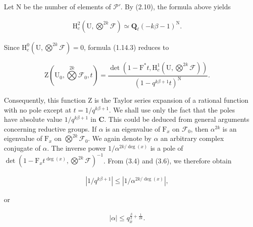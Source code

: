 \documentclass[10pt,leqno]{article}
\begin{document}
\noindent Let \(\mathrm{N}\) be the number of elements of \(\mathcal{P} '\). By (2.10), the formula above yields\par

\begin{equation*}\begin{gathered}\mathrm{H}_{c}^{2}(\mathrm{U},\bigotimes\limits^{2k}\mathcal{F} ) \simeq  \mathbf{Q}_{\ell }(- k\beta - 1)^{\mathrm{N}}.\end{gathered}\end{equation*}

\noindent Since \(\mathrm{H}_{c}^{0}(\mathrm{U},\bigotimes\limits^{2k}\mathcal{F} )=0\), formula (1.14.3) reduces to\par

\[\mathrm{Z}(\mathrm{U}_{0},\bigotimes\limits^{2k}\mathcal{F} _{0},t)=\frac{\operatorname{det}(1- \mathrm{F}^{*}t,\mathrm{H}_{c}^{1}(\mathrm{U},\bigotimes\limits^{2k}\mathcal{F} ))}{(1- q^{k\beta +1}t)^{\mathrm{N}}}.\]

\noindent Consequently, this function \(\mathrm{Z}\) is the Taylor series expansion of a rational function with no pole except at \(t=1/q^{k\beta +1}\). We shall use only the fact that the poles have absolute value \(1/q^{k\beta +1}\) in \(\mathbf{C}\). This could be deduced from general arguments concerning reductive groups. If \(\alpha \) is an eigenvalue of \(\mathrm{F}_{x}\) on \(\mathcal{F} _{0}\), then \(\alpha ^{2k}\) is an eigenvalue of \(\mathrm{F}_{x}\) on \(\bigotimes\limits^{2k}\mathcal{F} _{0}\). We again denote by \(\alpha \) an arbitrary complex conjugate of \(\alpha \). The inverse power \(1/\alpha ^{2k/\operatorname{deg}(x)}\) is a pole of \(\operatorname{det}(1- \mathrm{F}_{x} t^{\operatorname{deg}(x)},\bigotimes\limits^{2k}\mathcal{F} )^{- 1}\). From (3.4) and (3.6), we therefore obtain\par

\begin{equation*}\begin{gathered}|1/q^{k\beta +1}| \leq  |1/\alpha ^{2k/\operatorname{deg}(x)}|,\end{gathered}\end{equation*}

\noindent or\par

\begin{equation*}\begin{gathered}|\alpha | \leq  q_{x}^{\frac{\beta}{2}+\frac{1}{2k}}.\end{gathered}\end{equation*}
\end{document}
